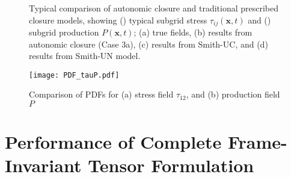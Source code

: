 %
\begin{figure}
	\ContinuedFloat
	\centering \hspace{1.5cm}
	\label{F:Smith_UC_P}
\end{figure}
%
\begin{figure}
	\ContinuedFloat
	\caption{Typical comparison of autonomic closure and traditional prescribed closure models, showing () typical subgrid stress $\tau_{ij}(\mathbf{x},t)$ and () subgrid production $P(\mathbf{x},t)$; (a) true fields, (b) results from autonomic closure (Case 3a), (c) results from Smith-UC, and (d) results from Smith-UN model.}
	\label{F:Smith_UC}
\end{figure}
%
%



%
\begin{figure}
	\centering \hspace{-1.75cm}
	\texttt{[image: PDF\_tauP.pdf]}
	\caption{Comparison of PDFs for (a) stress field $\tau_{12}$, and (b) production field $P$}
	\label{F:Smith_PDF}
\end{figure}
%
%


\section{Performance of Complete Frame-Invariant Tensor Formulation} 
\label{sec:10C}


